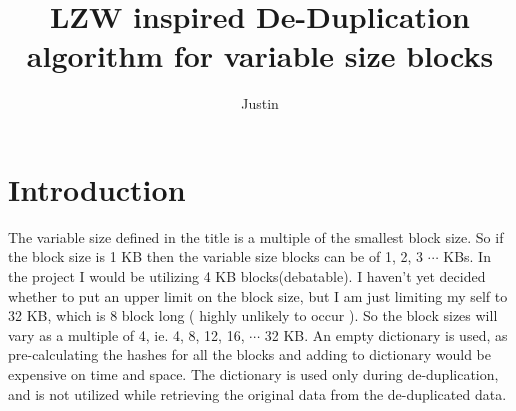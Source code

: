 \documentclass{article}
\title{LZW inspired De-Duplication algorithm for variable size blocks}
\author{Justin}
\date{}
\begin{document}
   \maketitle
   \section{Introduction}
   The variable size defined in the title is a multiple of the smallest block size. So if the block size is 1 KB then the variable size blocks can be of 1, 2, 3 $\cdots$ KBs. In the project I would be utilizing 4 KB blocks(debatable). I haven't yet decided whether to put an upper limit on the block size, but I am just limiting my self to 32 KB, which is 8 block long ( highly unlikely to occur ). So the block sizes will vary as a multiple of 4, ie. 4, 8, 12, 16, $\cdots$ 32 KB. An empty dictionary is used, as pre-calculating the hashes for all the blocks and adding to dictionary would be expensive on time and space. The dictionary is used only during de-duplication, and is not utilized while retrieving the original data from the de-duplicated data.
\end{document}
